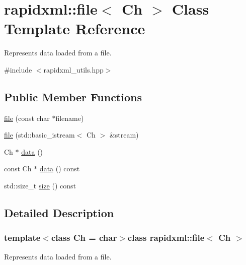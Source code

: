 \hypertarget{classrapidxml_1_1file}{\section{rapidxml\+:\+:file$<$ Ch $>$ Class Template Reference}
\label{classrapidxml_1_1file}
}


Represents data loaded from a file.  




{\ttfamily \#include $<$rapidxml\+\_\+utils.\+hpp$>$}

\subsection*{Public Member Functions}
\begin{DoxyCompactItemize}
\item 
\hyperlink{classrapidxml_1_1file_ae881a3cab1fe7152d45c92a8d7606cb3}{file} (const char $\ast$filename)
\item 
\hyperlink{classrapidxml_1_1file_a90707ccd991cc392dcf4bef37eed9d1f}{file} (std\+::basic\+\_\+istream$<$ Ch $>$ \&stream)
\item 
Ch $\ast$ \hyperlink{classrapidxml_1_1file_af1c71d65862c7af14e4708e32a80c1de}{data} ()
\item 
const Ch $\ast$ \hyperlink{classrapidxml_1_1file_aceb8f5ebd577c946a74b1ea3e2e0c576}{data} () const 
\item 
std\+::size\+\_\+t \hyperlink{classrapidxml_1_1file_a20191d167c6e00a88a44ca9a3a54e1c5}{size} () const 
\end{DoxyCompactItemize}


\subsection{Detailed Description}
\subsubsection*{template$<$class Ch = char$>$class rapidxml\+::file$<$ Ch $>$}

Represents data loaded from a file. 

